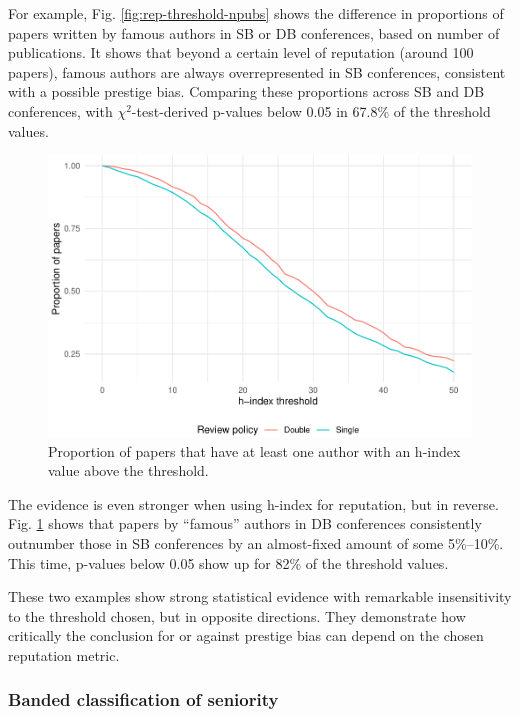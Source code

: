 \documentclass[12pt]{article}
\begin{document}
For example, Fig. \ref{fig:rep-threshold-npubs} shows the difference in proportions of papers written by famous authors in SB or DB conferences, based on number of publications.
It shows that beyond a certain level of reputation (around 100 papers), famous authors are always overrepresented in SB conferences, consistent with a possible prestige bias.
Comparing these proportions across SB and DB conferences, with \(\chi{}^2\)-test-derived p-values below 0.05 in 67.8\% of the threshold values.

\begin{figure}
\centering
\includegraphics{prestige_files/figure-latex/rep-threshold-h-1.pdf}
\caption{\label{fig:rep-threshold-h}Proportion of papers that have at least one author with an h-index value above the threshold.}
\end{figure}

The evidence is even stronger when using h-index for reputation, but in reverse.
Fig. \ref{fig:rep-threshold-h} shows that papers by ``famous'' authors in DB conferences consistently outnumber those in SB conferences by an almost-fixed amount of some 5\%--10\%.
This time, p-values below 0.05 show up for 82\% of the threshold values.

These two examples show strong statistical evidence with remarkable insensitivity to the threshold chosen, but in opposite directions.
They demonstrate how critically the conclusion for or against prestige bias can depend on the chosen reputation metric.

\hypertarget{banded-classification-of-seniority}{%
\subsubsection{Banded classification of seniority}\label{banded-classification-of-seniority}}
\end{document}
